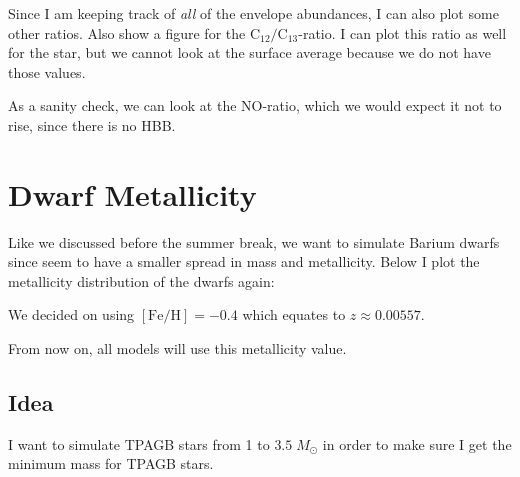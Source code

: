 \documentclass[a4paper,10pt]{article}
\begin{document}
Since I am keeping track of \emph{all} of the envelope abundances, I can also plot some other ratios. \citet{karakas2016} Also show a figure for the \(\text{C}_{12}/ \text{C}_{13}\)-ratio. I can plot this ratio as well for the star, but we cannot look at the surface average because we do not have those values.

\begin{figure}[ht]
    \centering
\end{figure}

As a sanity check, we can look at the NO-ratio, which we would expect it not to rise, since there is no HBB.

\begin{figure}[ht]
    \centering
\end{figure}


\section{Dwarf Metallicity}
Like we discussed before the summer break, we want to simulate Barium dwarfs since seem to have a smaller spread in mass and metallicity. Below I plot the metallicity distribution of the dwarfs again:
\begin{figure}[ht]
    \centering
\end{figure}

We decided on using \([\text{Fe/H} ] = -0.4\) which equates to \(z \approx 0.00557\).

From now on, all models will use this metallicity value.


\subsection{Idea}
I want to simulate TPAGB stars from 1 to \(3.5\;M_\odot \) in order to make sure I get the minimum mass for TPAGB stars.
\end{document}
